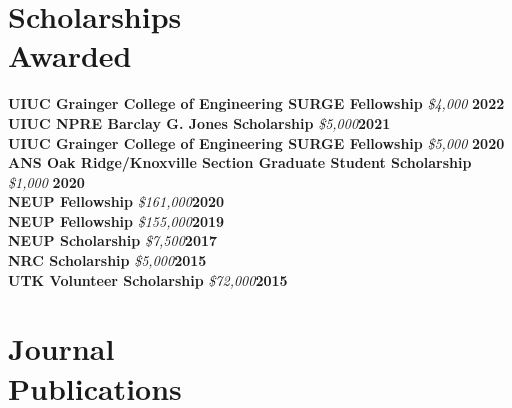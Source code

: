 \documentclass[margin,line]{resume}
\begin{document}
\begin{resume}
    \section{\mysidestyle Scholarships\\Awarded}
    \textbf{UIUC Grainger College of Engineering SURGE Fellowship} \textsl{\$4,000} \hfill \textbf{2022}\\
    \textbf{UIUC NPRE Barclay G. Jones Scholarship} \textsl{\$5,000}\hfill \textbf{2021}\\
    \textbf{UIUC Grainger College of Engineering SURGE Fellowship} \textsl{\$5,000} \hfill \textbf{2020}\\
    \textbf{ANS Oak Ridge/Knoxville Section Graduate Student Scholarship} \textsl{\$1,000} \hfill \textbf{2020}\\
    \textbf{NEUP Fellowship} \textsl{\$161,000}\hfill \textbf{2020}\\
    \textbf{NEUP Fellowship} \textsl{\$155,000}\hfill \textbf{2019}\\
    \textbf{NEUP Scholarship} \textsl{\$7,500}\hfill \textbf{2017}\\
    \textbf{NRC Scholarship} \textsl{\$5,000}\hfill \textbf{2015}\\
    \textbf{UTK Volunteer Scholarship} \textsl{\$72,000}\hfill \textbf{2015}\\

    \section{\mysidestyle Journal\\Publications}
      \begin{bibenum}
      \item {}
      \item {}
      \end{bibenum}


\end{resume}
\end{document}
